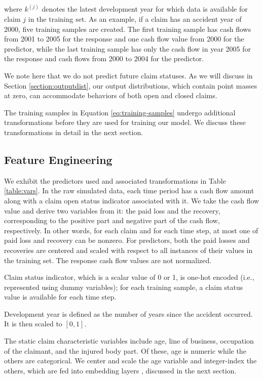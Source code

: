 \documentclass{article}
\begin{document}
where $k^{(j)}$ denotes the latest development year for which data is available
for claim $j$ in the training set. As an example, if a claim has an accident 
year of 2000, five training samples are created. The first training sample has 
cash flows from 2001 to 2005 for the response and one cash flow value from 2000
for the predictor, while the last training sample has only the cash flow in year
2005 for the response and cash flows from 2000 to 2004 for the predictor.

We note here that we do not predict future claim statuses. As we will discuss in
Section \ref{section:outputdist}, our output distributions, which contain point 
masses at zero, can accommodate behaviors of both open and closed claims.

The training samples in Equation \ref{eq:training-samples} undergo additional 
transformations before they are used for training our model. We discuss these 
transformations in detail in the next section.

\subsection{Feature Engineering} \label{sec:fe}

We exhibit the predictors used and associated transformations in Table 
\ref{table:vars}. In the raw simulated data, each time period has a cash flow
amount along with a claim open status indicator associated with it. We take the
cash flow value and derive two variables from it: the paid loss and the 
recovery, corresponding to the positive part and negative part of the cash flow,
respectively. In other words, for each claim and for each time step, at most one
of paid loss and recovery can be nonzero. For predictors, both the paid losses 
and recoveries are centered and scaled with respect to all instances of their 
values in the training set. The response cash flow values are not normalized.

Claim status indicator, which is a scalar value of 0 or 1, is one-hot encoded
(i.e., represented using dummy variables);
for each training sample, a claim status value is available for each time step.

Development year is defined as the number of years since the accident occurred. 
It is then scaled to $[0, 1]$.

The static claim characteristic variables include age, line of business, 
occupation of the claimant, and the injured body part. Of these, age is numeric
while the others are categorical. We center and scale the age variable and 
integer-index the others, which are fed into embedding layers
\cite{guoEntityEmbeddings2016}, discussed in the next section.
\end{document}
